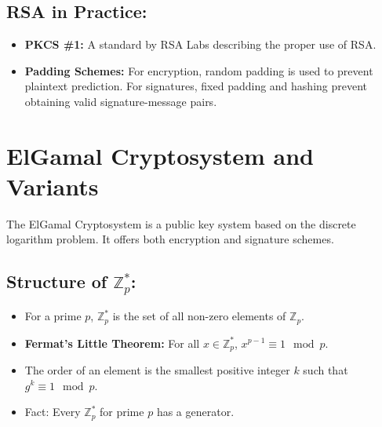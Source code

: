 \documentclass[12pt]{article}
\begin{document}
\subsection*{RSA in Practice:}
\begin{itemize}
    \item \textbf{PKCS \#1:} A standard by RSA Labs describing the proper use of RSA.
    \item \textbf{Padding Schemes:} For encryption, random padding is used to prevent plaintext prediction. For signatures, fixed padding and hashing prevent obtaining valid signature-message pairs.
\end{itemize}

\section*{ElGamal Cryptosystem and Variants}

The ElGamal Cryptosystem is a public key system based on the discrete logarithm problem. It offers both encryption and signature schemes.

\subsection*{Structure of \( \mathbb{Z}_p^* \):}
\begin{itemize}
    \item For a prime \( p \), \( \mathbb{Z}_p^* \) is the set of all non-zero elements of \( \mathbb{Z}_p \).
    \item \textbf{Fermat’s Little Theorem:} For all \( x \in \mathbb{Z}_p^* \), \( x^{p-1} \equiv 1 \mod p \).
    \item The order of an element is the smallest positive integer \( k \) such that \( g^k \equiv 1 \mod p \).
    \item Fact: Every \( \mathbb{Z}_p^* \) for prime \( p \) has a generator.
\end{itemize}
\end{document}
